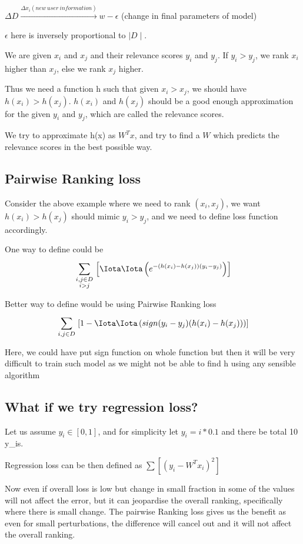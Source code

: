 \documentclass[11pt, twosides]{article}
\begin{document}
$\Delta D\xrightarrow{\Delta x_i(new\ user\ information)} w -\epsilon$ (change in final parameters of model)

$\epsilon$ here is inversely proportional to $\mid D\mid$.

We are given $x_i$ and $x_j$ and their relevance scores $y_i$ and $y_j$.
If  $y_i>y_j$, we rank $x_i$ higher than $x_j$, else we rank $x_j$ higher.

Thus we need a function h such that given $x_i>x_j$, we should have $h(x_i)>h(x_j)$.
$h(x_i)$ and $h(x_j)$ should be a good enough approximation for the given $y_i$ and $y_j$, which are called the relevance scores.

We try to approximate h(x) as $W^Tx$, and try to find a $W$ which predicts the relevance scores in the best possible way.

\subsection{Pairwise Ranking loss}
Consider the above example where we need to rank ${({x_i}, {x_j})}$, we want $h(x_i)>h(x_j)$ should mimic ${y_i}>{y_j}$, and we need to define loss function accordingly.

One way to define could be
	\[\sum\limits_{\begin{smallmatrix} 
 i,j \in{ D} \\ 
 {i}>{j} 
\end{smallmatrix}}^{{}}{\left[ \Iota \Iota \left( e^{-(h({x_i})-h({x_j}))({y_i}-{y_j})} \right) \right]}\]

Better way to define would be using Pairwise Ranking loss
	\[\sum\limits_{\begin{smallmatrix} 
 i,j \in{ D}
\end{smallmatrix}}^{{}}{\left[1- \Iota \Iota \left( sign({y_i}-{y_j})(h({x_i})-h({x_j})) \right) \right]}\]

Here, we could have put sign function on whole function but then it will be very difficult to train such model as we might not be able to find h using any sensible algorithm
\subsection{What if we try regression loss?}
Let us assume ${y_i} \in {[0,1]}$, and for simplicity let ${y_i}=i*0.1$ and there be total 10 {y_i}s.

Regression loss can be then defined as $\sum[({y_i} - {W^T}{x_i})^2]$

Now even if overall loss is low but change in small fraction in some of the values will not affect the error, but it can jeopardise the overall ranking, specifically where there is small change. The pairwise Ranking loss gives us the benefit as even for small perturbations, the difference will cancel out and it will not affect the overall ranking.
\end{document}
